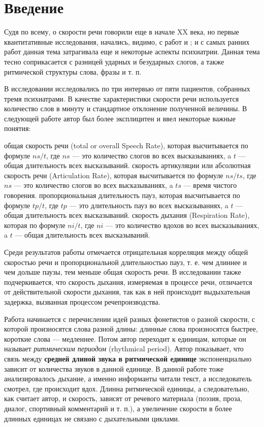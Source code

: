 \section{Введение}
\noindent Судя по всему, о скорости речи говорили еще в начале XX века, но первые квантитативные исследования, начались, видимо, с работ \citep{goldman54} и \citep{goldman56}; и с самых ранних работ данная тема затрагивала еще и некоторые аспекты психиатрии. Данная тема тесно соприкасается с разницей ударных и безударных слогов, а также ритмической структуры слова, фразы и т. п.
\par В исследовании \citep{goldman54} исследовались по три интервью от пяти пациентов, собранных тремя психиатрами. В качестве характеристики скорости речи используется количество слов в минуту и стандартное отклонение полученной величины. В следующей работе \citep{goldman56} автор был более эксплицитен и ввел некоторые важные понятия:
\begin{itemize}
\mytem общая скорость речи (total or overall Speech Rate), которая высчитывается по формуле ${ns}/t$, где ${ns}$ --- это количество слогов во всех высказываниях, a $t$ --- общая длительность всех высказываний.
\mytem скорость артикуляции или абсолютная скорость речи (Articulation Rate), которая высчитывается по формуле $ns/ts$, где $ns$ --- это количество слогов во всех высказываниях, a $ts$ --- время чистого говорения.
\mytem пропорциональная длительность пауз, которая высчитывается по формуле $tp/t$, где $tp$ --- это длительность пауз во всех высказываниях, a $t$ --- общая длительность всех высказываний.
\mytem скорость дыхания (Respiration Rate), которая по формуле $ni/t$, где ${ni}$ --- это количество вдохов во всех высказываниях, a $t$ --- общая длительность всех высказываний.
\end{itemize}
\par Среди результатов работы \citep{goldman56} отмечается отрицательная корреляция между общей скоростью речи и пропорциональной длительностью пауз, т. е. чем длиннее и чем дольше паузы, тем меньше общая скорость речи. В исследовании также подчеркивается, что скорость дыхания, измеряемая в процессе речи, отличается от действительной скорости дыхания, так как в ней происходит выдыхательная задержка, вызванная процессом речепроизводства.
\par Работа \citep{fonagy60} начинается с перечислении идей разных фонетистов о разной скорости, с которой произносятся слова разной длины: длинные слова произносятся быстрее, короткие слова --- медленнее. Потом автор переходит к единицам, которые он называет \textit{ритмическим периодом} (rhythmical period). Автор показывает, что связь между \textbf{средней длиной звука в ритмической единице} экспоненциально зависит от количества звуков в данной единице. В данной работе тоже анализировалось дыхание, а именно информанты читали текст, а исследователь смотрел, где происходит вдох. Длинна ритмической единицы, а следовательно, как считает автор, и скорость, зависят от речевого материала (поэзия, проза, диалог, спортивный комментарий и т. п.), а увеличение скорости в более длинных единицах не связано с дыхательными циклами. 

